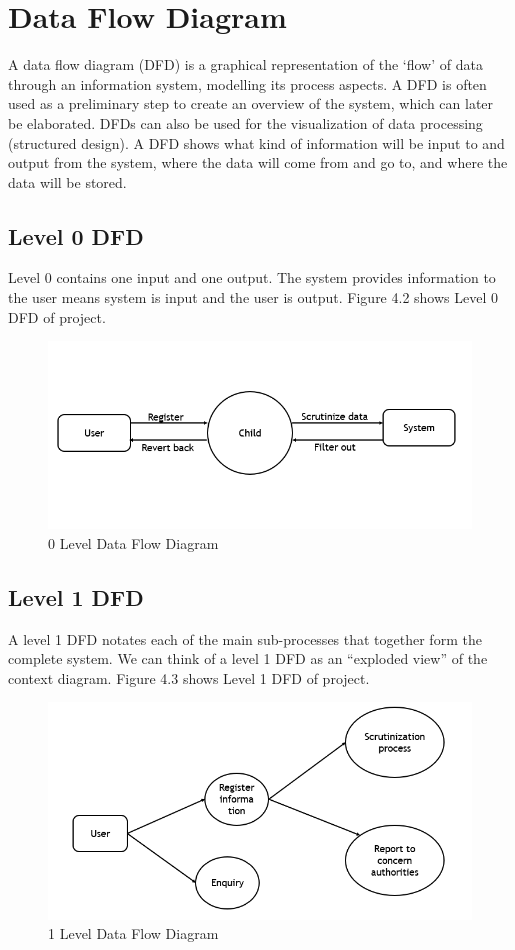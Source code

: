     
    
    
\section{Data Flow Diagram}

 A data flow diagram (DFD) is a graphical representation of the ‘flow’ of data through an information system, modelling its process aspects. A DFD is often used as a preliminary step to create an overview of the system, which can later be elaborated. DFDs can also be used for the visualization of data processing (structured design). A DFD shows what kind of information will be input to and output from the system, where the data will come from and go to, and where the data will be stored.

\subsection{Level 0 DFD}
Level 0 contains one input and one output. The system provides information to the user means system is input and the user is output. Figure 4.2 shows Level 0 DFD of project.
\begin{figure}[H]
    \centering
    \includegraphics[width = 12cm]{design/0 level DFD.png}
    \caption{ 0 Level Data Flow Diagram}
    \label{fig:my_label}
\end{figure}

\subsection{Level 1 DFD}
A level 1 DFD notates each of the main sub-processes that together form the complete system.   We can think of a level 1 DFD as an “exploded view” of the context diagram. 
Figure 4.3 shows Level 1 DFD of project.
\begin{figure}[H]
    \centering
    \includegraphics[width = 12cm]{design/1 Level DFD.png}
    \caption{  1 Level Data Flow Diagram }
    \label{fig:my_label}
\end{figure}


